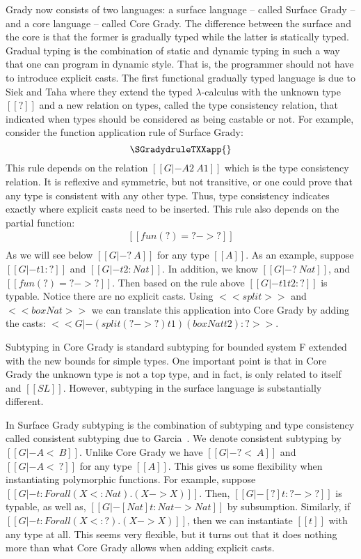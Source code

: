 Grady now consists of two languages: a surface language -- called
Surface Grady -- and a core language -- called Core Grady. The
difference between the surface and the core is that the former is
gradually typed while the latter is statically typed. Gradual typing
is the combination of static and dynamic typing in such a way that one
can program in dynamic style.  That is, the programmer should not have
to introduce explicit casts. The first functional gradually typed
language is due to Siek and Taha \cite{Siek:2006} where they extend
the typed $\lambda$-calculus with the unknown type $[[?]]$ and a new
relation on types, called the type consistency relation, that indicated
when types should be considered as being castable or not.  For
example, consider the function application rule of Surface Grady:
\[
\SGradydruleTXXapp{}
\]
This rule depends on the relation $[[G |- A2 ~ A1]]$ which is the type
consistency relation.  It is reflexive and symmetric, but not
transitive, or one could prove that any type is consistent with any
other type.  Thus, type consistency indicates exactly where explicit
casts need to be inserted.  This rule also depends on the partial
function:
\[
\begin{array}{lll}
  [[fun(?) = ? -> ?]]\\
  [[fun(A1 -> B1) = A1 -> B1]]
\end{array}
\]
As we will see below $[[G |- ? ~ A]]$ for any type $[[A]]$.  As an
example, suppose $[[G |- t1 : ?]]$ and $[[G |- t2 : Nat]]$.  In addition, we know
$[[G |- ? ~ Nat]]$, and $[[fun(?) = ? -> ?]]$.
Then
based on the rule above $[[G |- t1 t2 : ?]]$ is typable.  Notice
there are no explicit casts.  Using $<<split>>$ and $<<box Nat>>$ we
can translate this application into Core Grady by adding the casts:
$<<G |- (split (? -> ?) t1) (box Nat t2) : ?>>$.

Subtyping in Core Grady is standard subtyping for bounded system F
extended with the new bounds for simple types.  One important point is
that in Core Grady the unknown type is not a top type, and in fact, is
only related to itself and $[[SL]]$.  However, subtyping in the
surface language is substantially different.

In Surface Grady subtyping is the combination of subtyping and type
consistency called consistent subtyping due to
Garcia~\cite{Garcia:2016}.  We denote consistent subtyping by $[[G |-
    A <~ B]]$.  Unlike Core Grady we have $[[G |- ? <~ A]]$ and $[[G
    |- A <~ ?]]$ for any type $[[A]]$.  This gives us some flexibility
when instantiating polymorphic functions.  For example, suppose $[[G
    |- t : Forall (X <: Nat).(X -> X)]]$.  Then, $[[G |- [?]t : ? ->
    ?]]$ is typable, as well as, $[[G |- [Nat]t : Nat -> Nat]]$ by
subsumption.  Similarly, if $[[G |- t : Forall (X <: ?).(X -> X)]]$,
then we can instantiate $[[t]]$ with any type at all.  This seems very
flexible, but it turns out that it does nothing more than what Core
Grady allows when adding explicit casts.


